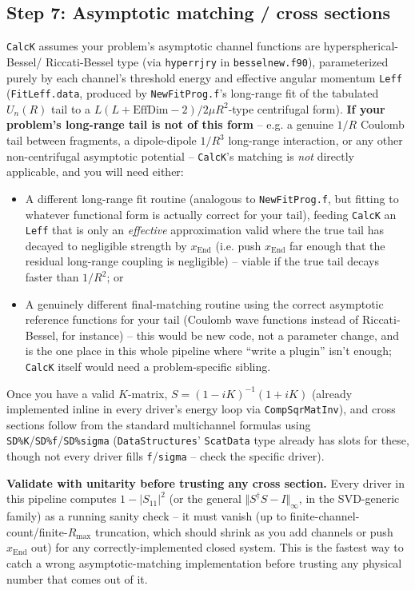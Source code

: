 \documentclass[11pt]{article}
\newcommand{\file}[1]{\texttt{#1}}
\newcommand{\sub}[1]{\texttt{#1}}
\begin{document}
\subsection*{Step 7: Asymptotic matching / cross sections}
\label{sec:asymptotics}
\sub{CalcK} assumes your problem's asymptotic channel functions are hyperspherical-Bessel/
Riccati-Bessel type (via \sub{hyperrjry} in \file{besselnew.f90}), parameterized purely by each
channel's threshold energy and effective angular momentum \texttt{Leff}
(\texttt{FitLeff.data}, produced by \file{NewFitProg.f}'s long-range fit of the tabulated $U_n(R)$
tail to a $L(L+\text{EffDim}-2)/2\mu R^2$-type centrifugal form). \textbf{If your problem's
long-range tail is not of this form} -- e.g. a genuine $1/R$ Coulomb tail between fragments, a
dipole-dipole $1/R^3$ long-range interaction, or any other non-centrifugal asymptotic potential --
\sub{CalcK}'s matching is \emph{not} directly applicable, and you will need either:
\begin{itemize}
\item A different long-range fit routine (analogous to \file{NewFitProg.f}, but fitting to
  whatever functional form is actually correct for your tail), feeding \sub{CalcK} an
  \texttt{Leff} that is only an \emph{effective} approximation valid where the true tail has
  decayed to negligible strength by $x_{\text{End}}$ (i.e. push $x_{\text{End}}$ far enough that
  the residual long-range coupling is negligible) -- viable if the true tail decays faster than
  $1/R^2$; or
\item A genuinely different final-matching routine using the correct asymptotic reference
  functions for your tail (Coulomb wave functions instead of Riccati-Bessel, for instance) --
  this would be new code, not a parameter change, and is the one place in this whole pipeline
  where ``write a plugin'' isn't enough; \sub{CalcK} itself would need a problem-specific sibling.
\end{itemize}
Once you have a valid $K$-matrix, $S=(1-iK)^{-1}(1+iK)$ (already implemented inline in every
driver's energy loop via \sub{CompSqrMatInv}), and cross sections follow from the standard
multichannel formulas using \texttt{SD\%K}/\texttt{SD\%f}/\texttt{SD\%sigma}
(\texttt{DataStructures}' \texttt{ScatData} type already has slots for these, though not every
driver fills \texttt{f}/\texttt{sigma} -- check the specific driver).

\textbf{Validate with unitarity before trusting any cross section.} Every driver in this pipeline
computes $1-|S_{11}|^2$ (or the general $\Vert S^\dagger S-I\Vert_\infty$, in the SVD-generic
family) as a running sanity check -- it must vanish (up to finite-channel-count/finite-$R_{\max}$
truncation, which should shrink as you add channels or push $x_{\text{End}}$ out) for any
correctly-implemented closed system. This is the fastest way to catch a wrong asymptotic-matching
implementation before trusting any physical number that comes out of it.
\end{document}
